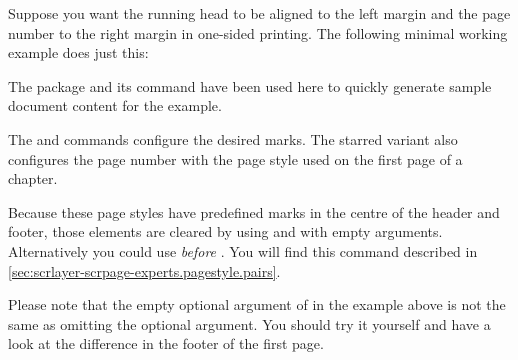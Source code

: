     \begin{Example}
      Suppose you want the running head to be aligned to the left margin and 
      the page number to the right margin in one-sided printing. The following
      minimal working example does just this:
      The  package and its
       command have been used
      here to quickly generate sample document content for the example.

      The  and
       commands
      configure the desired marks. The starred variant 
      \iffalse%
        configures the page number mark not only on the pages set with the
        \DescRef{\LabelBase.pagestyle.scrheadings}%
        \IndexPagestyle{scrheadings} page style but also those set
        with the \PageStyle{plain} %
      \else%
        also configures the page number with the %
      \fi%
       page style used on the first page of
      a chapter.%

      Because these page styles have predefined marks in the centre of the
      header and footer, those elements are cleared by using
       and
       with empty arguments. Alternatively
      you could use
       \emph{before}
      . You will find this command
      described in \autoref{sec:scrlayer-scrpage-experts.pagestyle.pairs}.
    \end{Example}

    Please note that the empty optional argument of
     in the example above is not the same
    as omitting the optional argument. You should try it yourself and have a 
    look at the difference in the footer of the first page.%
  \fi

